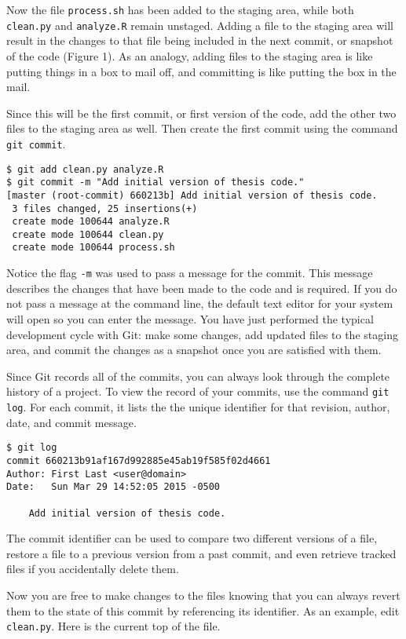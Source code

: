 Now the file \verb|process.sh| has been added to the staging area, while both \verb|clean.py| and \verb|analyze.R| remain unstaged.
Adding a file to the staging area will result in the changes to that file being included in the next commit, or snapshot of the code (Figure 1).
As an analogy, adding files to the staging area is like putting things in a box to mail off, and committing is like putting the box in the mail.

Since this will be the first commit, or first version of the code, add the other two files to the staging area as well.
Then create the first commit using the command \verb|git commit|.

\begin{lstlisting}
$ git add clean.py analyze.R
$ git commit -m "Add initial version of thesis code."
[master (root-commit) 660213b] Add initial version of thesis code.
 3 files changed, 25 insertions(+)
 create mode 100644 analyze.R
 create mode 100644 clean.py
 create mode 100644 process.sh
\end{lstlisting}

Notice the flag \verb|-m| was used to pass a message for the commit.
This message describes the changes that have been made to the code and is required.
If you do not pass a message at the command line, the default text editor for your system will open so you can enter the message.
You have just performed the typical development cycle with Git:
make some changes, add updated files to the staging area, and commit the changes as a snapshot once you are satisfied with them.

Since Git records all of the commits, you can always look through the complete history of a project.
To view the record of your commits, use the command \verb|git log|.
For each commit, it lists the the unique identifier for that revision, author, date, and commit message.

\begin{lstlisting}
$ git log
commit 660213b91af167d992885e45ab19f585f02d4661
Author: First Last <user@domain>
Date:   Sun Mar 29 14:52:05 2015 -0500

    Add initial version of thesis code.
\end{lstlisting}

The commit identifier can be used to compare two different versions of a file, restore a file to a previous version from a past commit, and even retrieve tracked files if you accidentally delete them.

Now you are free to make changes to the files knowing that you can always revert them to the state of this commit by referencing its identifier.
As an example, edit \verb|clean.py|.
Here is the current top of the file.

